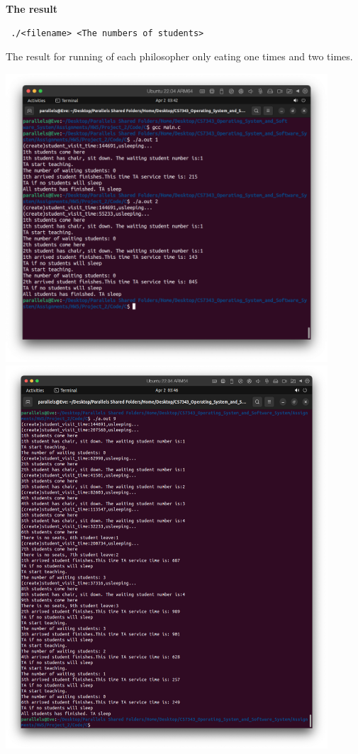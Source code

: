 \documentclass[12pt]{article}
\newenvironment{sol}[1][Solution]{\begin{trivlist}\item[\hskip\labelsep {\bfseries #1:}]}{\end{trivlist}}
\begin{document}
\begin{sol}
\begin{verbatim}
        \end{verbatim}
    
        \textbf{The result}
    \begin{verbatim}
 ./<filename> <The numbers of students>
    \end{verbatim}
    The result for running of each philosopher only eating one times and two times.
    \begin{center}
        \includegraphics[width=0.9\textwidth]{1.png}
        \includegraphics[width=0.9\textwidth]{12.png}
    \end{center}
    
    \end{sol}
\end{document}
